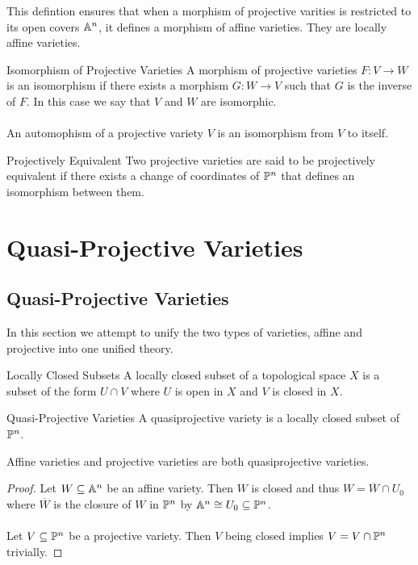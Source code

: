 \documentclass[a4paper]{article}
\begin{document}
This defintion ensures that when a morphism of projective varities is restricted to its open covers $\mathbb{A}^n$, it defines a morphism of affine varieties. They are locally affine varieties. 

\begin{defn}{Isomorphism of Projective Varieties}{} A morphism of projective varieties $F:V\to W$ is an isomorphism if there exists a morphism $G:W\to V$ such that $G$ is the inverse of $F$. In this case we say that $V$ and $W$ are isomorphic. \\~\\
An automophism of a projective variety $V$ is an isomorphism from $V$ to itself. 
\end{defn}

\begin{defn}{Projectively Equivalent}{} Two projective varieties are said to be projectively equivalent if there exists a change of coordinates of $\mathbb{P}^n$ that defines an isomorphism between them. 
\end{defn}

\pagebreak
\section{Quasi-Projective Varieties}
\subsection{Quasi-Projective Varieties}
In this section we attempt to unify the two types of varieties, affine and projective into one unified theory. 

\begin{defn}{Locally Closed Subsets}{} A locally closed subset of a topological space $X$ is a subset of the form $U\cap V$ where $U$ is open in $X$ and $V$ is closed in $X$. 
\end{defn}

\begin{defn}{Quasi-Projective Varieties}{} A quasiprojective variety is a locally closed subset of $\mathbb{P}^n$. 
\end{defn}

\begin{lmm}{}{} Affine varieties and projective varieties are both quasiprojective varieties. \tcbline
\begin{proof}
Let $W\subseteq\mathbb{A}^n$ be an affine variety. Then $W$ is closed and thus $W=\overline{W}\cap U_0$ where $\overline{W}$ is the closure of $W$ in $\mathbb{P}^n$ by $\mathbb{A}^n\cong U_0\subseteq\mathbb{P}^n$. \\~\\
Let $V\subseteq\mathbb{P}^n$ be a projective variety. Then $V$ being closed implies $V=V\cap\mathbb{P}^n$ trivially. 
\end{proof}
\end{lmm}
\end{document}
